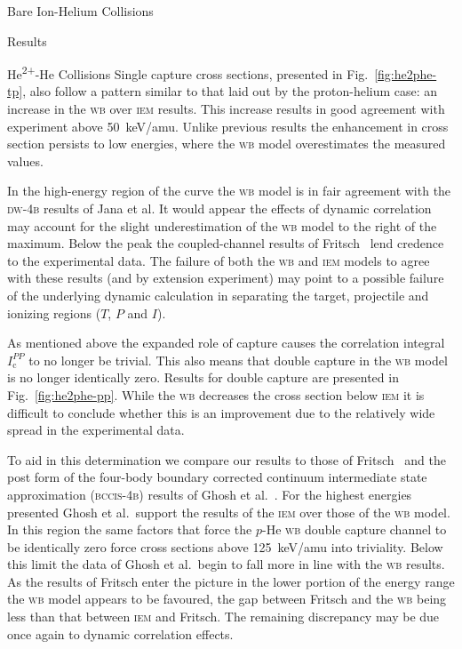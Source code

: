 \documentclass[letterpaper, 11 pt]{report}
\begin{document}
\begin{chapter}{Bare Ion-Helium Collisions \label{chap:p-he2p-he}}
\begin{section}{Results \label{sec:phe2p-res}}
\begin{subsection}{\texorpdfstring{He\textsuperscript{2+}}{He2+}-He Collisions
                         \label{sec:he2phe-res}}
         Single capture cross sections, presented in Fig.~\ref{fig:he2phe-tp}, also follow a pattern
         similar to that laid out by the proton-helium case: an increase in the \textsc{wb} over
         \textsc{iem} results. This increase results in good agreement with experiment above 50~keV/amu.
         Unlike previous results the enhancement in cross section persists to low energies, where the
         \textsc{wb} model overestimates the measured values.

         In the high-energy region of the curve the \textsc{wb} model is in fair agreement with the
         \textsc{dw-4b} results of Jana et al. It would appear the effects of dynamic correlation may
         account for the slight underestimation of the \textsc{wb} model to the right of the maximum.
         Below the peak the coupled-channel results of Fritsch~\cite{Fritsch-94} lend credence to the
         experimental data. The failure of both the \textsc{wb} and \textsc{iem} models to agree with
         these results (and by extension experiment) may point to a possible failure of the underlying
         dynamic calculation in separating the target, projectile and ionizing regions ($T$, $P$ and
         $I$).

         As mentioned above the expanded role of capture causes the correlation integral
         $I^{PP}_\mathrm{c}$ to no longer be trivial. This also means that double capture in the
         \textsc{wb} model is no longer identically zero. Results for double capture are presented in
         Fig.~\ref{fig:he2phe-pp}. While the \textsc{wb} decreases the cross section below \textsc{iem}
         it is difficult to conclude whether this is an improvement due to the relatively wide spread in
         the experimental data.

         To aid in this determination we compare our results to those of Fritsch~\cite{Fritsch-94} and
         the post form of the four-body boundary corrected continuum intermediate state approximation
         (\textsc{bccis-4b}) results of Ghosh et al.~\cite{GDMP-08}. For the highest energies presented
         Ghosh et al.\ support the results of the \textsc{iem} over those of the \textsc{wb} model. In
         this region the same factors that force the $p$-He \textsc{wb} double capture channel to be
         identically zero force cross sections above 125~keV/amu into triviality. Below this limit the
         data of Ghosh et al.\ begin to fall more in line with the \textsc{wb} results. As the results
         of Fritsch enter the picture in the lower portion of the energy range the \textsc{wb} model
         appears to be favoured, the gap between Fritsch and the \textsc{wb} being less than that
         between \textsc{iem} and Fritsch. The remaining discrepancy may be due once again to dynamic
         correlation effects.


\end{subsection}
\end{section}
\end{chapter}
\end{document}
